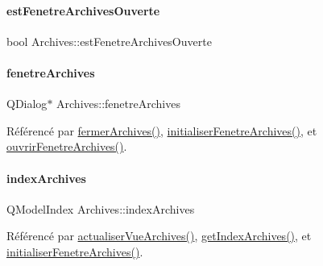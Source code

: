 \paragraph{\texorpdfstring{est\+Fenetre\+Archives\+Ouverte}{estFenetreArchivesOuverte}}
{\footnotesize\ttfamily bool Archives\+::est\+Fenetre\+Archives\+Ouverte\hspace{0.3cm}{\ttfamily [private]}}

\mbox{\label{class_archives_ad7c8209637b01f638b64530020d18b8e}} 
\paragraph{\texorpdfstring{fenetre\+Archives}{fenetreArchives}}
{\footnotesize\ttfamily Q\+Dialog$\ast$ Archives\+::fenetre\+Archives\hspace{0.3cm}{\ttfamily [private]}}



Référencé par \hyperlink{class_archives_a0001d8b6a783f1f424965832e89a1f6f}{fermer\+Archives()}, \hyperlink{class_archives_a1842ebad3721929949bc07be5144b79c}{initialiser\+Fenetre\+Archives()}, et \hyperlink{class_archives_a14d4f834ea05cf421161336607b4bb31}{ouvrir\+Fenetre\+Archives()}.

\mbox{\label{class_archives_a31cba52f3979585ee5e2b9390d21322b}} 
\paragraph{\texorpdfstring{index\+Archives}{indexArchives}}
{\footnotesize\ttfamily Q\+Model\+Index Archives\+::index\+Archives\hspace{0.3cm}{\ttfamily [private]}}



Référencé par \hyperlink{class_archives_a380ac387d773b07ea5138347dbaca65a}{actualiser\+Vue\+Archives()}, \hyperlink{class_archives_a3df83e6dd301afe331d7e75bd1b84a57}{get\+Index\+Archives()}, et \hyperlink{class_archives_a1842ebad3721929949bc07be5144b79c}{initialiser\+Fenetre\+Archives()}.

\mbox{\label{class_archives_af311679d957985d956a4ee5ad28a5988}} 
